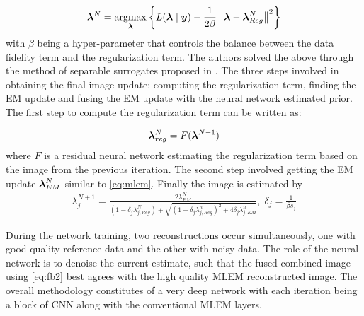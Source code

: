 \begin{itemize}
\begin{equation}
\bm{\lambda}^{N}=\underset{\bm{\lambda}}{\operatorname{argmax}}\left\{L(\bm{\lambda} \mid \bm{y})-\frac{1}{2 \beta}\left\|\bm{\lambda}-\bm{\lambda}_{R e g}^{N}\right\|^{2}\right\}
\end{equation}
with $\beta$ being a hyper-parameter that controls the balance between the data fidelity term and the regularization term. The authors solved the above through the method of separable surrogates proposed in \cite{depierro1995}. The three steps involved in obtaining the final image update: computing the regularization term, finding the EM update and fusing the EM update with the neural network estimated prior. The first step to compute the regularization term can be written as:

\begin{equation}\label{eq:fbs1}
\bm{\lambda}_{reg}^N = F(\bm{\lambda}^{N-1})
\end{equation} 
where $F$ is a residual neural network estimating the regularization term based on the image from the previous iteration. 
The second step involved getting the EM update $\bm{\lambda}_{EM}^{N}$ similar to \ref{eq:mlem}. Finally the image is estimated by
\begin{equation}\label{eq:fb2}
\begin{array}{l}
\lambda_j^{N+1} 
=\frac{2 \lambda_{E M}^{N}}{\left(1-\delta_{j} \lambda_{j, R e g}^{N}\right)+\sqrt{\left(1-\delta_{j} \lambda_{j, R e g}^{n}\right)^{2}+4 \delta_{j} \lambda_{j, E M}^{n}}} ,\; \delta_{j}=\frac{1}{\beta s_{j}}
\end{array}
\end{equation}

During the network training, two reconstructions occur simultaneously, one with good quality reference data and the other with noisy data. The role of the neural network is to denoise the current estimate, such that the fused combined image using \ref{eq:fb2} best agrees with the high quality \ac{MLEM} reconstructed image. The overall methodology constitutes of a very deep network with each iteration being a block of \ac{CNN} along with the conventional \ac{MLEM} layers. 



\end{itemize}
